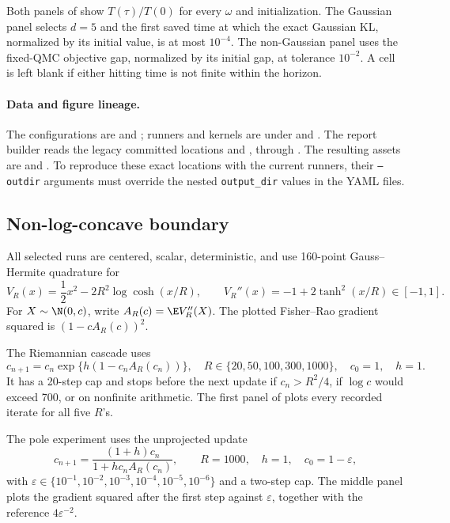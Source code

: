 Both panels of  show
\(T(\tau)/T(0)\) for every \(\omega\) and initialization.  The Gaussian panel
selects \(d=5\) and the first saved time at which the exact Gaussian KL,
normalized by its initial value, is at most \(10^{-4}\).  The non-Gaussian
panel uses the fixed-QMC objective gap, normalized by its initial gap, at
tolerance \(10^{-2}\).  A cell is left blank if either hitting time is not
finite within the horizon.

\paragraph{Data and figure lineage.}
\begingroup\small\raggedright
The configurations are  and
; runners and kernels are
under  and .  The report
builder reads the legacy committed locations
 and
, through
.  The resulting assets
are  and
.  To reproduce
these exact locations with the current runners, their \texttt{--outdir}
arguments must override the nested \texttt{output\_dir} values in the YAML
files.
\par\endgroup

\subsection{Non-log-concave boundary}

All selected runs are centered, scalar, deterministic, and use 160-point
Gauss--Hermite quadrature for
\[
  V_R(x)=\frac12x^2-2R^2\log\cosh(x/R),\qquad
  V_R''(x)=-1+2\tanh^2(x/R)\in[-1,1].
\]
For \(X\sim\N(0,c)\), write
\(A_R(c)=\E V_R''(X)\).  The plotted Fisher--Rao gradient squared is
\((1-cA_R(c))^2\).

The Riemannian cascade uses
\[
  c_{n+1}=c_n\exp\{h(1-c_nA_R(c_n))\},
  \quad R\in\{20,50,100,300,1000\},
  \quad c_0=1,\quad h=1.
\]
It has a 20-step cap and stops before the next update if
\(c_n>R^2/4\), if \(\log c\) would exceed 700, or on nonfinite arithmetic.
The first panel of  plots every recorded iterate for all
five \(R\)'s.

The pole experiment uses the unprojected update
\[
  c_{n+1}=\frac{(1+h)c_n}{1+hc_nA_R(c_n)},
  \qquad R=1000,\quad h=1,\quad c_0=1-\varepsilon,
\]
with \(\varepsilon\in\{10^{-1},10^{-2},10^{-3},10^{-4},10^{-5},10^{-6}\}\)
and a two-step cap.  The middle panel plots the gradient squared after the first
step against \(\varepsilon\), together with the reference
\(4\varepsilon^{-2}\).

